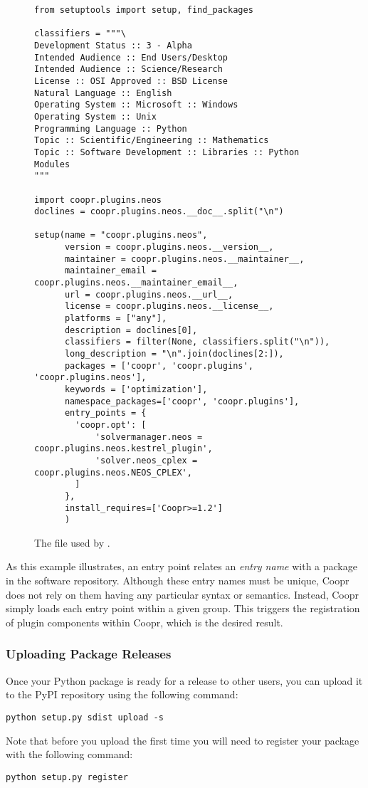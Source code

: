 \begin{figure}
\begin{lstlisting}
from setuptools import setup, find_packages

classifiers = """\
Development Status :: 3 - Alpha
Intended Audience :: End Users/Desktop
Intended Audience :: Science/Research
License :: OSI Approved :: BSD License
Natural Language :: English
Operating System :: Microsoft :: Windows
Operating System :: Unix
Programming Language :: Python
Topic :: Scientific/Engineering :: Mathematics
Topic :: Software Development :: Libraries :: Python Modules
"""

import coopr.plugins.neos
doclines = coopr.plugins.neos.__doc__.split("\n")

setup(name = "coopr.plugins.neos",
      version = coopr.plugins.neos.__version__,
      maintainer = coopr.plugins.neos.__maintainer__,
      maintainer_email = coopr.plugins.neos.__maintainer_email__,
      url = coopr.plugins.neos.__url__,
      license = coopr.plugins.neos.__license__,
      platforms = ["any"],
      description = doclines[0],
      classifiers = filter(None, classifiers.split("\n")),
      long_description = "\n".join(doclines[2:]),
      packages = ['coopr', 'coopr.plugins', 'coopr.plugins.neos'],
      keywords = ['optimization'],
      namespace_packages=['coopr', 'coopr.plugins'],
      entry_points = {
        'coopr.opt': [
            'solvermanager.neos = coopr.plugins.neos.kestrel_plugin',
            'solver.neos_cplex = coopr.plugins.neos.NEOS_CPLEX',
        ]
      },
      install_requires=['Coopr>=1.2']
      )
\end{lstlisting}
\caption{\label{fig:setup} The  file used by .}
\end{figure}

As this example
illustrates, an entry point relates an \textit{entry name} with a package
in the software repository.  Although these entry names must be unique,
Coopr does not rely on them having any particular syntax or semantics.
Instead, Coopr simply loads each entry point within a given group.
This triggers the registration of plugin components within Coopr, which
is the desired result.


\subsubsection{Uploading Package Releases}

Once your Python package is ready for a release to other users, you can upload it to the PyPI 
repository using the following command:
\begin{lstlisting}
python setup.py sdist upload -s
\end{lstlisting}
Note that before you upload the first time you will need to register your 
package with the following command:
\begin{lstlisting}
python setup.py register
\end{lstlisting}

